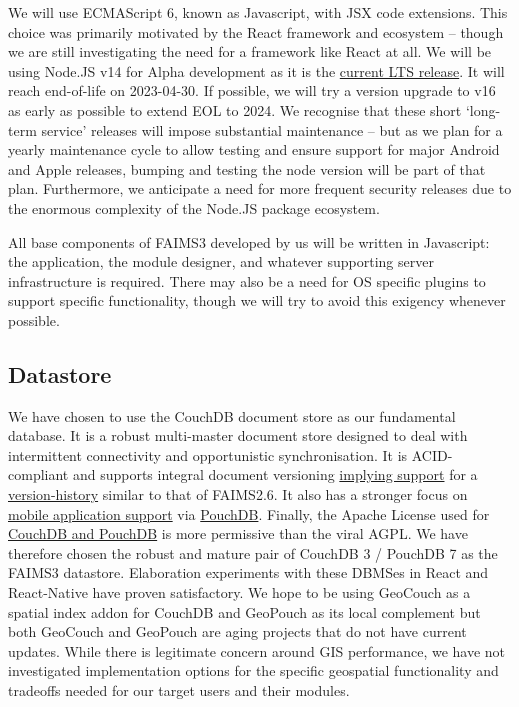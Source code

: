 \documentclass{faims3_report}
\begin{document}
We will use ECMAScript 6, known as Javascript, with JSX code extensions.
This choice was primarily motivated by the React framework and ecosystem
-- though we are still investigating the need for a framework like
React at all. We will be using Node.JS v14 for Alpha development as it
is the \href{https://nodejs.org/en/about/releases/}{{current LTS
release}}. It will reach end-of-life on 2023-04-30. If possible, we will
try a version upgrade to v16 as early as possible to extend EOL to 2024.
We recognise that these short `long-term service' releases will impose
substantial maintenance -- but as we plan for a yearly maintenance
cycle to allow testing and ensure support for major Android and Apple
releases, bumping and testing the node version will be part of that
plan. Furthermore, we anticipate a need for more frequent security
releases due to the enormous complexity of the Node.JS package
ecosystem.

All base components of FAIMS3 developed by us will be written in
Javascript: the application, the module designer, and whatever
supporting server infrastructure is required. There may also be a need
for OS specific plugins to support specific functionality, though we
will try to avoid this exigency whenever possible.

\subsection{Datastore}

We have chosen to use the CouchDB document store as our fundamental
database. It is a robust multi-master document store designed to deal
with intermittent connectivity and opportunistic synchronisation. It is
ACID-compliant and supports integral document versioning
\href{https://docs.couchdb.org/en/stable/api/database/misc.html\#db-revs-diff}{{implying
support}} for a
\href{https://dba.stackexchange.com/a/248675}{{version-history}} similar
to that of FAIMS2.6. It also has a stronger focus on
\href{https://severalnines.com/database-blog/battle-nosql-databases-comparing-mongodb-and-couchdb}{{mobile
application support}} via \href{https://pouchdb.com/}{{PouchDB}}.
Finally, the Apache License used for
\href{https://db-engines.com/en/system/CouchDB\%3BMongoDB\%3BPouchDB}{{CouchDB
and PouchDB}} is more permissive than the viral AGPL. We have therefore
chosen the robust and mature pair of CouchDB 3 / PouchDB 7 as the FAIMS3
datastore. Elaboration experiments with these DBMSes in React and
React-Native have proven satisfactory. We hope to be using GeoCouch as a
spatial index addon for CouchDB and GeoPouch as its local complement but
both GeoCouch and GeoPouch are aging projects that do not have current
updates. While there is legitimate concern around GIS performance, we
have not investigated implementation options for the specific geospatial
functionality and tradeoffs needed for our target users and their
modules.
\end{document}
